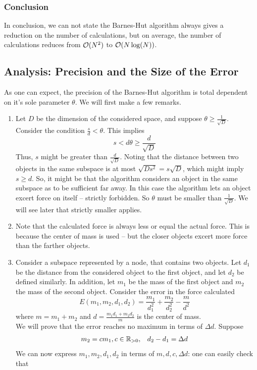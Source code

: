 \subsubsection*{Conclusion}
In conclusion, we can not state the Barnes-Hut algorithm always gives a reduction on the number of calculations, but on average, the number of calculations reduces from $\mathcal{O}(N^2)$ to $\mathcal{O}(N\log(N))$.
\subsection{Analysis: Precision and the Size of the Error}
As one can expect, the precision of the Barnes-Hut algorithm is total dependent on it's sole parameter $\theta$. We will first make a few remarks.
\begin{enumerate}
\item Let $D$ be the dimension of the considered space, and suppose $\theta \geq \frac{1}{\sqrt{D}}$. Consider the condition $\frac{s}{d} < \theta$. This implies
\[
s < d\theta \geq \frac{d}{\sqrt{D}}
\]
Thus, $s$ might be greater than $\frac{d}{\sqrt{D}}$. Noting that the distance between two objects in the same subspace is at most $\sqrt{Ds^2} = s\sqrt{D}$, which might imply $s\geq d$. So, it might be that the algorithm considers an object in the same subspace as to be sufficient far away. In this case the algorithm lets an object excert force on itself -- strictly forbidden. So $\theta$ must be smaller than $\frac{1}{\sqrt{D}}$. We will see later that strictly smaller applies.
\item Note that the calculated force is always less or equal the actual force. This is because the center of mass is used -- but the closer objects excert more force than the farther objects.
\item Consider a subspace represented by a node, that contains two objects. Let $d_1$ be the distance from the considered object to the first object, and let $d_2$ be defined similarly. In addition, let $m_1$ be the mass of the first object and $m_2$ the mass of the second object. Consider the error in the force calculated
\[
E(m_1,m_2,d_1,d_2) = \frac{m_1}{d_1^2}+\frac{m_2}{d_2^2}-\frac{m}{d^2}
\]
where $m = m_1+m_2$ and $d = \frac{m_1d_1+m_2d_2}{m}$ is the center of mass.\\
We will prove that the error reaches no maximum in terms of $\Delta d$. Suppose
\[
\begin{array}{cc}
m_2 = cm_1, c\in \mathbb{R}_{>0}, & d_2-d_1 = \Delta d
\end{array}
\]
We can now express $m_1,m_2,d_1,d_2$ in terms of $m,d,c,\Delta d$: one can easily check that

\end{enumerate}
